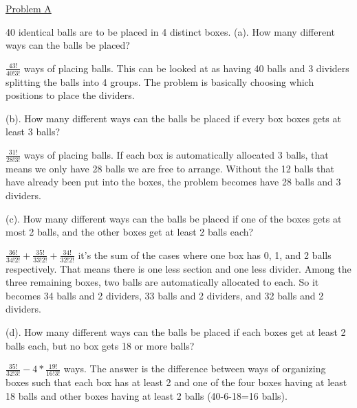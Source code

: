 \documentclass{article}
\begin{document}
\underline{Problem A}\newline{}

40 identical balls are to be placed in 4 distinct boxes.\newline{}
(a). How many different ways can the balls be placed?\newline{}

$\frac{43!}{40!3!}$ ways of placing balls. This can be looked at as having 40 balls and 3 dividers splitting the balls into 4 groups. The problem is basically choosing which positions to place the dividers.\newline{}

(b). How many different ways can the balls be placed if every box boxes gets at least 3 balls?\newline{}

$\frac{31!}{28!3!}$ ways of placing balls. If each box is automatically allocated 3 balls, that means we only have 28 balls we are free to arrange. Without the 12 balls that have already been put into the boxes, the problem becomes have 28 balls and 3 dividers.\newline{}

(c). How many different ways can the balls be placed if one of the boxes gets at most 2 balls, and the other
boxes get at least 2 balls each?\newline{}

$\frac{36!}{34!2!}+\frac{35!}{33!2!}+\frac{34!}{32!2!}$ it's the sum of the cases where one box has 0, 1, and 2 balls respectively. That means there is one less section and one less divider. Among the three remaining boxes, two balls are automatically allocated to each. So it becomes 34 balls and 2 dividers, 33 balls and 2 dividers, and 32 balls and 2 dividers.\newline{}

(d). How many different ways can the balls be placed if each boxes get at least 2 balls each, but no box gets
18 or more balls?\newline{}

$\frac{35!}{32!3!}-4*\frac{19!}{16!3!}$ ways. The answer is the difference between ways of organizing boxes such that each box has at least 2 and one of the four boxes having at least 18 balls and other boxes having at least 2 balls (40-6-18=16 balls).
\end{document}
